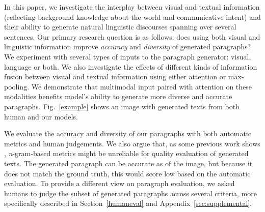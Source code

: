 \documentclass[11pt,a4paper]{article}
\begin{document}
In this paper, we investigate the interplay between visual and textual information (reflecting background knowledge about the world and communicative intent) and their ability to generate natural linguistic discourses spanning over several sentences.
Our primary research question is as follows: does %
using both visual and linguistic information improve \emph{accuracy} and \emph{diversity} of generated paragraphs?
We experiment with several types of inputs to the paragraph generator: visual, language or both.
We also investigate the effects of different kinds of information fusion between visual and textual information using either attention or max-pooling. %
We demonstrate that multimodal input paired with attention on these modalities benefits model's ability to generate more diverse and accurate paragraphs.
Fig.~\ref{example} shows an image with generated texts from both human and our models.

We evaluate the accuracy and diversity of our paragraphs with both automatic metrics and human judgements.
We also argue that, as some previous work shows \cite{vanderlee2019}, \textit{n}-gram-based metrics might be unreliable for quality evaluation of generated texts.
The generated paragraph can be accurate as of the image, but because it does not match the ground truth, this would score low based on the automatic evaluation.
To provide a different view on paragraph evaluation, we asked humans to judge the subset of generated paragraphs across several criteria, more specifically described in Section~\ref{humaneval} and Appendix~\ref{sec:supplemental}.


\end{document}
